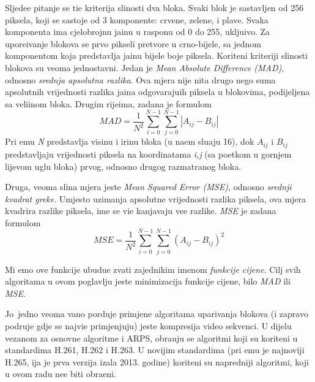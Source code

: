 Sljede\cj e pitanje se ti\ch e kriterija sli\ch nosti dva bloka. Svaki blok je sastavljen od 256 piksela, koji se sastoje od 3 komponente: crvene, zelene, i plave. Svaka komponenta ima cjelobrojnu ja\ch inu u rasponu od 0 do 255, uklju\ch ivo.
Za upore\dj ivanje blokova se prvo pikseli pretvore u crno-bijele, sa jednom komponentom koja predstavlja ja\ch inu bijele boje piksela.
Kori\sh teni kriteriji sli\ch nosti blokova su veoma jednostavni. Jedan je  \textit{Mean Absolute Difference (MAD)}, odnosno \textit{srednja apsolutna razlika}. Ova mjera nije ni\sh ta drugo nego suma apsolutnih vrijednosti razlika
ja\ch ina odgovaraju\cj ih piksela u blokovima, podijeljena sa veli\ch inom bloka. Drugim rije\ch ima, zadana je formulom
$$
MAD = \frac{1}{N^2}\sum_{i=0}^{N-1}\sum_{j=0}^{N-1}|A_{ij}-B_{ij}|
$$
Pri \ch emu \textit{N} predstavlja visinu i \sh irinu bloka (u na\sh em slu\ch aju 16), dok $A_{ij}$ i $B_{ij}$ predstavljaju vrijednosti piksela na koordinatama \textit{i,j} (sa po\ch etkom u gornjem lijevom uglu bloka) prvog,
odnosno drugog razmatranog bloka. 

Druga, veoma sli\ch na mjera jeste \textit{Mean Squared Error (MSE)}, odnosno \textit{srednji kvadrat gre\sh ke}. Umjesto uzimanja apsolutne vrijednosti razlika piksela, ova mjera kvadrira razlike piksela, \ch ime se vi\sh e
ka\zh njavaju ve\cj e razlike. \textit{MSE} je zadana formulom
$$
MSE = \frac{1}{N^2}\sum_{i=0}^{N-1}\sum_{j=0}^{N-1}(A_{ij}-B_{ij})^2
$$

Mi \cj emo ove funkcije ubudu\cj e zvati zajedni\ch kim imenom \textit{funkcije cijene}. Cilj svih algoritama u ovom poglavlju jeste minimizacija funkcije cijene, bilo \textit{MAD} ili \textit{MSE}.

Jo\sh\ jedno veoma va\zh no pordu\ch je primjene algoritama uparivanja blokova (i zapravo podru\ch je gdje se najvi\sh e primjenjuju) jeste kompresija video sekvenci. U dijelu vezanom za osnovne algoritme i ARPS,
obra\dj uju se algoritmi koji su kori\sh teni u standardima H.261, H.262 i H.263. U novijim standardima (pri \ch emu je najnoviji H.265, \ch ija je prva verzija iza\sh la 2013. godine) kori\sh teni su napredniji algoritmi, koji u
ovom radu ne\cj e biti obra\dj eni.

